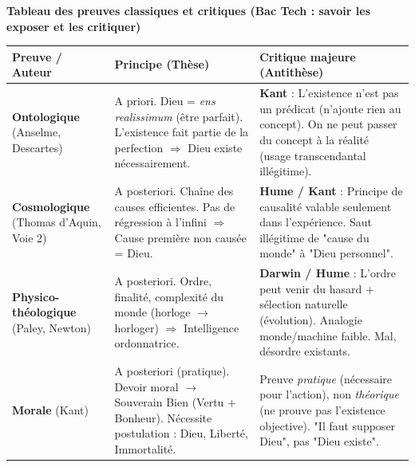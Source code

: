 \documentclass[11pt]{article}
\begin{document}
\begin{aretenir}
\textbf{Tableau des preuves classiques et critiques (Bac Tech : savoir les exposer et les critiquer)}
\begin{center}
\begin{tabularx}{\linewidth}{|l|X|X|}\hline
\rowcolor{popblueL}
\textbf{Preuve / Auteur} & \textbf{Principe (Thèse)} & \textbf{Critique majeure (Antithèse)} \\ \hline
\textbf{Ontologique} \newline (Anselme, Descartes) & A priori. Dieu = \emph{ens realissimum} (être parfait). L'existence fait partie de la perfection $\Rightarrow$ Dieu existe nécessairement. & \textbf{Kant} : L'existence n'est pas un prédicat (n'ajoute rien au concept). On ne peut passer du concept à la réalité (usage transcendantal illégitime). \\ \hline
\textbf{Cosmologique} \newline (Thomas d'Aquin, Voie 2) & A posteriori. Chaîne des causes efficientes. Pas de régression à l'infini $\Rightarrow$ Cause première non causée = Dieu. & \textbf{Hume / Kant} : Principe de causalité valable seulement dans l'expérience. Saut illégitime de "cause du monde" à "Dieu personnel". \\ \hline
\textbf{Physico-théologique} \newline (Paley, Newton) & A posteriori. Ordre, finalité, complexité du monde (horloge $\to$ horloger) $\Rightarrow$ Intelligence ordonnatrice. & \textbf{Darwin / Hume} : L'ordre peut venir du hasard + sélection naturelle (évolution). Analogie monde/machine faible. Mal, désordre existants. \\ \hline
\textbf{Morale} \newline (Kant) & A posteriori (pratique). Devoir moral $\to$ Souverain Bien (Vertu + Bonheur). Nécessite postulation : Dieu, Liberté, Immortalité. & Preuve \emph{pratique} (nécessaire pour l'action), non \emph{théorique} (ne prouve pas l'existence objective). "Il faut supposer Dieu", pas "Dieu existe". \\ \hline
\end{tabularx}
\end{center}


\end{aretenir}
\end{document}
